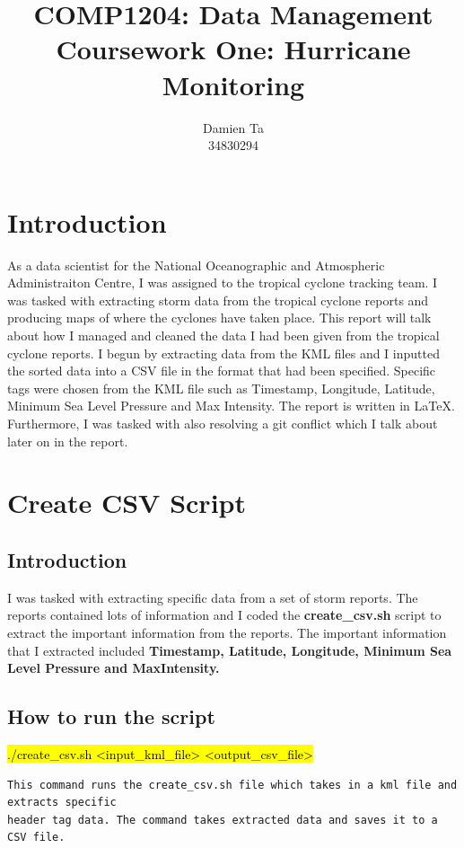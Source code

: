 \documentclass[]{article}
\title{COMP1204: Data Management \\ Coursework One: Hurricane Monitoring }
\author{Damien Ta \\ 34830294}
\begin{document}
\maketitle

\section{Introduction}
As a data scientist for the National Oceanographic and Atmospheric Administraiton Centre, I was assigned to the tropical cyclone
tracking team. I was tasked with extracting storm data from the tropical cyclone reports and producing maps of where the cyclones
have taken place. 
\newline
\newline
This report will talk about how I managed and cleaned the data I had been given from the tropical cyclone reports. I begun by extracting data from the
KML files and I inputted the sorted data into a CSV file in the format that had been specified. Specific tags
were chosen from the KML file such as Timestamp, Longitude, Latitude, Minimum Sea Level Pressure and Max Intensity.
The report is written in LaTeX. Furthermore, I was tasked with also resolving a git conflict which I
talk about later on in the report.

\clearpage

\section{Create CSV Script}
\subsection{Introduction}
I was tasked with extracting specific data from a set of storm reports.
The reports contained lots of information and I coded the \textbf{create\_csv.sh}
script to extract the important information from the reports.
The important information that I extracted included \textbf{Timestamp, Latitude,
Longitude, Minimum Sea Level Pressure and MaxIntensity.}

\subsection{How to run the script}
\begin{tcolorbox}[colback=white, colframe=black, boxrule=1pt, arc=2mm, 
    title=Script to run create\_csv.sh, width=6.7in, fonttitle=\bfseries, listing only, listing options={language=sh, basicstyle=\ttfamily}]
\hl{./create\_csv.sh <input\_kml\_file> <output\_csv\_file>}
\begin{verbatim}
This command runs the create_csv.sh file which takes in a kml file and extracts specific
header tag data. The command takes extracted data and saves it to a CSV file.
\end{verbatim}
\end{tcolorbox}
\end{document}

